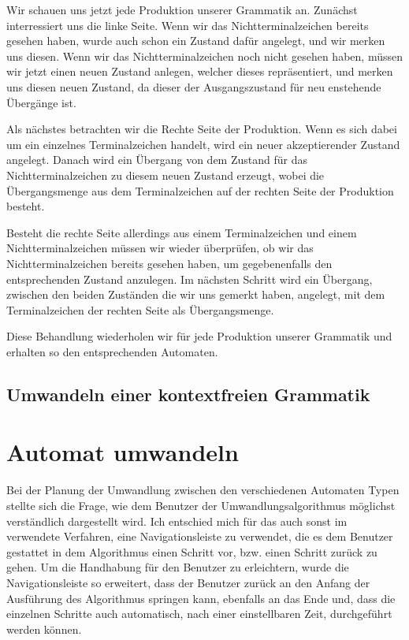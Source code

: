 Wir schauen uns jetzt jede Produktion unserer Grammatik an.
Zunächst interressiert uns die linke Seite. Wenn wir das Nichtterminalzeichen
bereits gesehen haben, wurde auch schon ein Zustand dafür angelegt, und wir
merken uns diesen. Wenn wir das Nichtterminalzeichen noch nicht gesehen haben,
müssen wir jetzt einen neuen Zustand anlegen, welcher dieses repräsentiert, und
merken uns diesen neuen Zustand, da dieser der Ausgangszustand
für neu enstehende Übergänge ist.\vspace{10pt}

Als nächstes betrachten wir die Rechte Seite der Produktion. Wenn es sich dabei
um ein einzelnes Terminalzeichen handelt, wird ein neuer akzeptierender Zustand
angelegt. Danach wird ein Übergang von dem Zustand für das Nichtterminalzeichen
zu diesem neuen Zustand erzeugt, wobei die Übergangsmenge aus dem
Terminalzeichen auf der rechten Seite der Produktion besteht.\vspace{10pt}

Besteht die rechte Seite allerdings aus einem Terminalzeichen und einem
Nichtterminalzeichen müssen wir wieder überprüfen, ob wir das
Nichtterminalzeichen bereits gesehen haben, um gegebenenfalls den
entsprechenden Zustand anzulegen. Im nächsten Schritt wird ein Übergang,
zwischen den beiden Zuständen die wir uns gemerkt haben, angelegt, mit dem
Terminalzeichen der rechten Seite als Übergangsmenge.\vspace{10pt}

Diese Behandlung wiederholen wir für jede Produktion unserer Grammatik und
erhalten so den entsprechenden Automaten.

\subsection{Umwandeln einer kontextfreien Grammatik}




\section{Automat umwandeln}

Bei der Planung der Umwandlung zwischen den verschiedenen Automaten Typen
stellte sich die Frage, wie dem Benutzer der Umwandlungsalgorithmus möglichst
verständlich dargestellt wird. Ich entschied mich für das auch sonst im
\gtitool verwendete Verfahren, eine Navigationsleiste zu verwendet, die es dem
Benutzer gestattet in dem Algorithmus einen Schritt vor, bzw. einen Schritt
zurück zu gehen. Um die Handhabung für den Benutzer zu erleichtern, wurde die
Navigationsleiste so erweitert, dass der Benutzer zurück an den Anfang der
Ausführung des Algorithmus springen kann, ebenfalls an das Ende und, dass die
einzelnen Schritte auch automatisch, nach einer einstellbaren Zeit, durchgeführt
werden können.\vspace{10pt}

